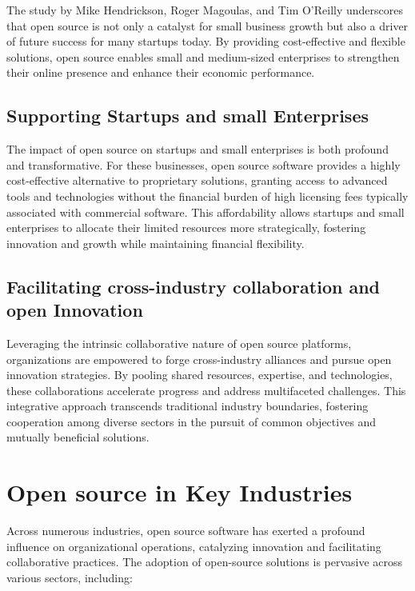 The study \cite{opensource_hendrickson2012economic} by Mike Hendrickson, Roger Magoulas, 
and Tim O'Reilly underscores that open source is not only a catalyst for small business growth but also a driver of future success for many startups today. 
By providing cost-effective and flexible solutions,
open source enables small and medium-sized enterprises to strengthen their online presence and enhance their economic performance.


\subsection{Supporting Startups and small Enterprises}

The impact of open source on startups and small enterprises is both profound and transformative. 
For these businesses, open source software provides a highly cost-effective alternative to proprietary solutions, 
granting access to advanced tools and technologies without the financial burden of high licensing fees typically associated with commercial software. 
This affordability allows startups and small enterprises to allocate their limited resources more strategically,
fostering innovation and growth while maintaining financial flexibility.

\cite{studiolabs_open_source_startups_2024}

\subsection{Facilitating cross-industry collaboration and open Innovation}

Leveraging the intrinsic collaborative nature of open source platforms, organizations are empowered to forge cross-industry alliances and pursue open innovation 
strategies. By pooling shared resources, expertise, and technologies, these collaborations accelerate progress and address multifaceted challenges. 
This integrative approach transcends traditional industry boundaries, fostering cooperation among diverse sectors in the pursuit of common objectives and mutually beneficial solutions.

\section{Open source in Key Industries}

Across numerous industries, open source software has exerted a profound influence on organizational operations, catalyzing innovation and facilitating collaborative practices. The adoption of open-source solutions is pervasive across various sectors, including: 

